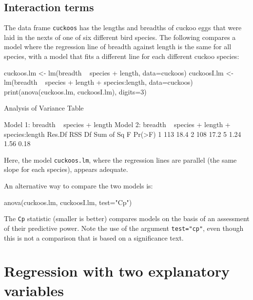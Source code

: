 \documentclass{tufte-book}\usepackage[]{graphicx}\usepackage[]{color}
\newcommand{\txtt}[1]{\texttt{#1}}
\begin{document}
\subsection*{Interaction terms}
The data frame \txtt{cuckoos} has the lengths and breadths of cuckoo
eggs that were laid in the nexts of one of six different bird species.
The following compares a model where the regression line of
breadth against length is the same for all species, with a
model that fits a different line for each different cuckoo species:
\begin{fullwidth}
\begin{Schunk}
\begin{Sinput}
cuckoos.lm <- lm(breadth ~ species + length, data=cuckoos)
cuckoosI.lm <- lm(breadth ~ species + length + species:length, data=cuckoos)
print(anova(cuckoos.lm, cuckoosI.lm), digits=3)
\end{Sinput}
\begin{Soutput}
Analysis of Variance Table

Model 1: breadth ~ species + length
Model 2: breadth ~ species + length + species:length
  Res.Df  RSS Df Sum of Sq    F Pr(>F)
1    113 18.4                         
2    108 17.2  5      1.24 1.56   0.18
\end{Soutput}
\end{Schunk}
\end{fullwidth}

\noindent Here, the model \txtt{cuckoos.lm}, where the regression lines are
parallel (the same slope for each species), appears adequate.

An alternative way to compare the two models is:
\begin{Schunk}
\begin{Sinput}
anova(cuckoos.lm, cuckoosI.lm, test="Cp")
\end{Sinput}
\end{Schunk}
The \txtt{Cp} statistic (smaller is better) compares models on the basis
of an assessment of their predictive power. Note the use of the
argument \txtt{test="cp"}, even though this is not a comparison
that is based on a significance text.

\section{Regression with two explanatory variables}\label{sec:nihills-reg}
\end{document}
